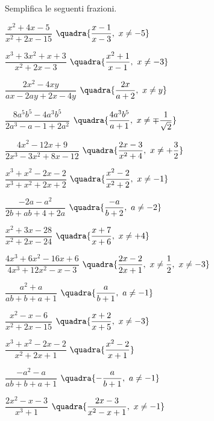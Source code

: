 \begin{esercizio}[\Ast]
\label{ese:19.10}
Semplifica le seguenti frazioni.
\begin{multicols}{2}
\begin{enumeratea}
 \item \(\dfrac{x^{2}+4x-5}{x^{2}+2x-15}\)
  \hfill {\footnotesize \(\quadra{\dfrac{x-1}{x-3},~ x \neq -5}\)}
 \item \(\dfrac{x^{3}+3x^{2}+x+3}{x^{2}+2x-3}\)
  \hfill {\footnotesize \(\quadra{\dfrac{x^2+1}{x-1},~ x \neq -3}\)}
 \item \(\dfrac{2x^{2}-4xy}{ax-2ay+2x-4y}\)
  \hfill {\footnotesize \(\quadra{\dfrac{2x}{a+2},~ x \neq y}\)}
 \item \(\dfrac{8a^{5}b^{5}-4a^{3}b^{5}}{2a^{3}-a-1+2a^{2}}\)
  \hfill {\footnotesize \(\quadra{\dfrac{4a^{3}b^{5}}{a+1},~ 
                                 x \neq \mp \dfrac{1}{\sqrt{2}}}\)}
 \item \(\dfrac{4x^{2}-12x+9}{2x^{3}-3x^{2}+8x-12}\)
  \hfill {\footnotesize \(\quadra{\dfrac{2x-3}{x^{2}+4},~ 
                                 x \neq +\dfrac{3}{2}}\)}
 \item \(\dfrac{x^{3}+x^{2}-2x-2}{x^{3}+x^{2}+2x+2}\)
  \hfill {\footnotesize \(\quadra{\dfrac{x^2-2}{x^2+2},~ x \neq -1}\)}
 \item \(\dfrac{-2a-a^{2}}{2b+ab+4+2a}\)
  \hfill {\footnotesize \(\quadra{\dfrac{-a}{b+2},~ a \neq -2}\)}
 \item \(\dfrac{x^{2}+3x-28}{x^{2}+2x-24}\)
  \hfill {\footnotesize \(\quadra{\dfrac{x+7}{x+6},~ x \neq +4}\)}
 \item \(\dfrac{4 x^{3} + 6 x^{2} - 16 x + 6}{4 x^{3} + 12 x^{2} - x - 3}\)
  \hfill {\footnotesize \(\quadra{\dfrac{2x-2}{2x+1},~ 
                                 x \neq \dfrac{1}{2},~x \neq -3}\)}
 \item \(\dfrac{a^{2}+a}{ab+b+a+1}\)
  \hfill {\footnotesize \(\quadra{\dfrac{a}{b+1},~ a \neq -1}\)}
 \item \(\dfrac{x^{2}-x-6}{x^{2}+2x-15}\)
  \hfill {\footnotesize \(\quadra{\dfrac{x+2}{x+5},~ x \neq -3}\)}
 \item \(\dfrac{x^{3}+x^{2}-2x-2}{x^{2}+2x+1}\)
  \hfill {\footnotesize \(\quadra{\dfrac{x^{2}-2}{x+1}}\)}
 \item \(\dfrac{-a^{2}-a}{ab+b+a+1}\)
  \hfill {\footnotesize \(\quadra{-\dfrac{a}{b+1},~ a \neq -1}\)}
 \item \(\dfrac{2x^{2}-x-3}{x^{3}+1}\)
  \hfill {\footnotesize \(\quadra{\dfrac{2x-3}{x^2-x+1},~ x \neq -1}\)}

\end{enumeratea}
\end{multicols}
\end{esercizio}
